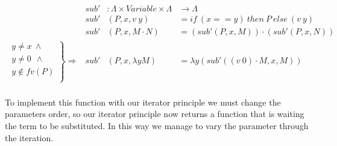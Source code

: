 \documentclass{entcs}
\begin{document}
\[
\begin{array}{rrll}
&sub' &: \Lambda \times Variable \times  \Lambda &   \rightarrow  \Lambda  \\
&sub' &(P , x , v\ y)         &= if\ (x == y)\ then\ P\ else\ (v\ y)   \\
&sub' &(P , x , M \cdot N)    &= (sub' (P , x , M)) \cdot (sub' (P , x , N)) \\
\left. 
\begin{array}{c}
y \neq x  \ \wedge \\
 y \neq 0\ \  \wedge \\
 y \not\in fv(P) \\
\end{array} \right\} \Rightarrow&sub' &(P , x , \lambda y M)   &= \lambda y (sub' ((v\ 0) \cdot M , x , M)) \\
\end{array} \]

To implement this function with our iterator principle we must change the parameters order, so our iterator principle now returns a function that is waiting the term to be substituted. In this way we manage to vary the parameter through the iteration.

 \hspace{5px}


\end{document}

